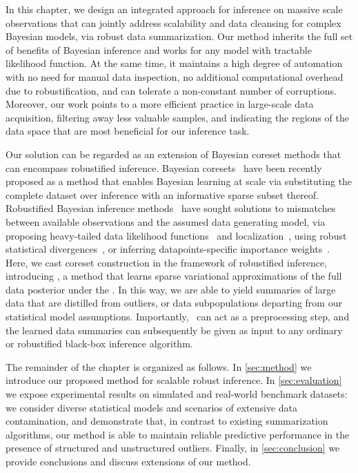 In this chapter, we design an integrated approach for inference on massive scale observations that can jointly address scalability and data cleansing for complex Bayesian models, via robust data summarization. Our method inherits the full set of benefits of Bayesian inference and works for any model with tractable likelihood function. At the same time, it maintains a high degree of automation with no need for manual data inspection, no additional computational overhead due to robustification, and can tolerate a non-constant number of corruptions. Moreover, our work points to a more efficient practice in large-scale data acquisition, filtering away less valuable samples, and indicating the regions of the data space that are most beneficial for our inference task. 

Our solution can be regarded as an extension of Bayesian coreset methods that can encompass robustified inference. Bayesian coresets~\cite{huggins16, campbell19jmlr, campbell19neurips} have been recently proposed as a method that enables Bayesian learning at scale via substituting the complete dataset over inference with an informative sparse subset thereof. Robustified Bayesian inference methods~\cite{berger94} have sought solutions to mismatches between available observations and the assumed data generating model, %
via proposing heavy-tailed data likelihood functions~\cite{huber09, insua12} and localization~\cite{definetti61, wang18}, using robust statistical divergences~\cite{futami18, knoblauch18, miller19},  or inferring datapoints-specific importance weights~\cite{wang17}. Here, we cast coreset construction in the framework of robustified inference, introducing \emph{\bcores{}}, a method that learns sparse variational approximations of the full data posterior under the \bdiv{}. In this way, we are able to yield summaries of large data that are distilled from outliers, or data subpopulations departing from our statistical model assumptions. Importantly, \mbox{\bcores}~can act as a preprocessing step, and the learned data summaries can subsequently be given as input to any ordinary or robustified black-box inference algorithm.

The remainder of the chapter is organized as follows. In \cref{sec:method} we introduce our proposed method for scalable robust inference. In \cref{sec:evaluation} we expose experimental results on simulated and real-world benchmark datasets: we consider diverse statistical models and scenarios of extensive data contamination, and demonstrate that, in contrast to existing summarization algorithms, our method is able to maintain reliable predictive performance in the presence of structured and unstructured outliers. Finally, in \cref{sec:conclusion} we provide conclusions and discuss extensions of our method.





